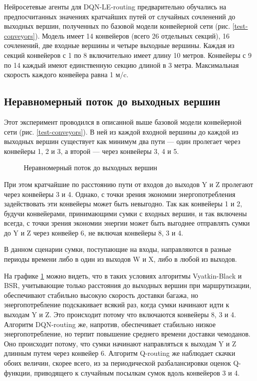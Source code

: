\documentclass[specification,annotation,times]{itmo-student-thesis}
\theoremstyle{definition}
\begin{document}
Нейросетевые агенты для DQN-LE-routing предварительно обучались на
предпосчитанных значениях кратчайших путей от случайных сочленений до выходных вершин,
полученных по базовой модели конвейерной сети (рис. \ref{test-conveyors}).
Модель имеет 14 конвейеров (всего 26 отдельных секций), 16 сочленений, две
входные вершины и четыре выходные вершины. Каждая из секций конвейеров с 1 по 8
включительно имеет длину 10 метров. Конвейеры с 9 по 14 каждый имеют
единственную секцию длиной в 3 метра. Максимальная скорость каждого конвейера
равна 1 м/c.

\subsection{Неравномерный поток до выходных вершин}

Этот эксперимент проводился в описанной выше базовой модели конвейерной сети
(рис. \ref{test-conveyors}). В ней из каждой входной вершины до каждой из
выходных вершин существует как минимум два пути --- один пролегает через
конвейеры 1, 2 и 3, а второй --- через конвейеры 3, 4 и 5.

\begin{figure}[!h]
  \centering
  \hfil
  \caption{Неравномерный поток до выходных вершин}\label{experiments:conveyors:1}
\end{figure}

При этом кратчайшие по расстоянию пути от входов до выходов Y и Z пролегают
через конвейеры 3 и 4. Однако, с точки зрения экономии энергопотребления
задействовать эти конвейеры может быть невыгодно. Так как конвейеры 1 и 2,
будучи конвейерами, принимающими сумки с входных вершин, и так включены всегда,
с точки зрения экономии энергии может быть выгоднее отправлять сумки до Y и Z
через конвейер 6, не включая конвейеры 8, 3 и 4.

В данном сценарии сумки, поступающие на входы, направляются в разные периоды
времени либо в один из выходов W и X, либо в любой из выходов.

На графике \ref{experiments:conveyors:1} можно видеть, что в таких условиях
алгоритмы Vyatkin-Black и BSR, учитывающие только расстояния до выходных вершин
при маршрутизации, обеспечивают стабильно высокую скорость доставки багажа, но
энергопотребление подскакивает всякий раз, когда сумки начинают идти к выходам Y
и Z. Это происходит потому что включаются конвейеры 8, 3 и 4. Алгоритм
DQN-routing же, напротив, обеспечивает стабильно низкое энергопотребление, но
терпит повышение среднего времени доставки чемоданов. Оно происходит потому, что
сумки начинают направляться к выходам Y и Z длинным путем через конвейер 6.
Алгоритм Q-routing же наблюдает скачки обоих величин, скорее всего, из за
периодической разбалансировки оценок Q-функции, приводящего к случайным посылкам
сумок вдоль конвейеров 3 и 4.
\end{document}
